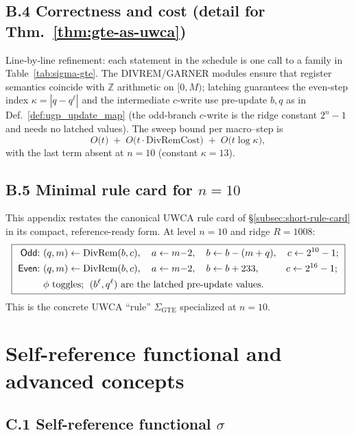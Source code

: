 \documentclass[12pt]{article}
\numberwithin{equation}{section}
\newcommand{\Z}{\mathbb{Z}}
\begin{document}
\subsection*{B.4  Correctness and cost (detail for Thm.~\ref{thm:gte-as-uwca})}
Line‑by‑line refinement: each statement in the schedule is one call to a family in Table~\ref{tab:sigma-gte}. The DIVREM/GARNER modules ensure that register semantics coincide with \(\Z\) arithmetic on \([0,M)\); latching guarantees the even-step index \(\kappa=|q-q^\ell|\) and the intermediate \(c\)-write use pre‑update \(b,q\) as in Def.~\ref{def:ugp_update_map} (the odd-branch \(c\)-write is the ridge constant \(2^{n}-1\) and needs no latched values). The sweep bound per macro–step is
\[
O\!\big(t\big)\;+\;O\!\big(t\cdot \mathrm{DivRemCost}\big)\;+\;O\!\big(t\log\kappa\big),
\]
with the last term absent at \(n{=}10\) (constant \(\kappa=13\)).

\subsection*{B.5 Minimal rule card for \(n=10\)}\label{subsec:minimal-rule-card}
\noindent This appendix restates the canonical UWCA rule card of §\ref{subsec:short-rule-card} in its compact, reference-ready form.
At level \(n{=}10\) and ridge \(R{=}1008\):
\[
\boxed{\ \begin{aligned}
\textsf{Odd:}\ & (q,m)\leftarrow\mathrm{DivRem}(b,c),\quad a\leftarrow m{-}2,\quad b\leftarrow b-(m+q),\quad c\leftarrow 2^{10}-1;\\
\textsf{Even:}\ & (q,m)\leftarrow\mathrm{DivRem}(b,c),\quad a\leftarrow m{-}2,\quad b\leftarrow b+233,\quad\;\;\;\;\;\ c\leftarrow 2^{16}-1;\\
& \phi\text{ toggles;\; }(b^\ell,q^\ell)\text{ are the latched pre-update values.}
\end{aligned}\ }
\]
This is the concrete UWCA ``rule'' \(\Sigma_{\mathrm{GTE}}\) specialized at \(n{=}10\).

\section{Self-reference functional and advanced concepts}\label{app:self-reference}

\subsection*{C.1  Self-reference functional $\sigma$}
\end{document}
